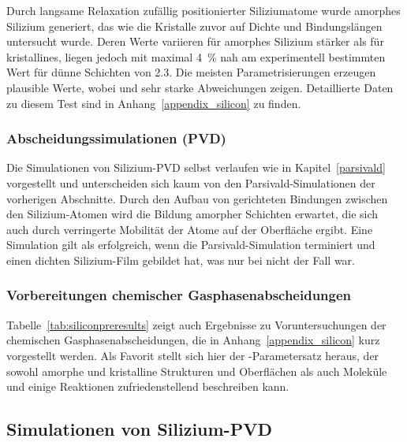 Durch langsame Relaxation zufällig positionierter Siliziumatome wurde amorphes Silizium generiert, das wie die Kristalle zuvor auf Dichte und Bindungslängen untersucht wurde.
Deren Werte variieren für amorphes Silizium stärker als für kristallines, liegen jedoch mit maximal \SI{4}{\percent} nah am experimentell bestimmten Wert für dünne Schichten von \SI{2.3}{\gpcc}\cite{remes_optical_1998}.
Die meisten Parametrisierungen erzeugen plausible Werte, wobei  und  sehr starke Abweichungen zeigen.
Detaillierte Daten zu diesem Test sind in Anhang~\ref{appendix_silicon} zu finden.

\subsubsection{Abscheidungssimulationen (PVD)}

Die Simulationen von Silizium-PVD selbst verlaufen wie in Kapitel~\ref{parsivald} vorgestellt und unterscheiden sich kaum von den Parsivald-Simulationen der vorherigen Abschnitte.
Durch den Aufbau von gerichteten Bindungen zwischen den Silizium-Atomen wird die Bildung amorpher Schichten erwartet, die sich auch durch verringerte Mobilität der Atome auf der Oberfläche ergibt.
Eine Simulation gilt als erfolgreich, wenn die Parsivald-Simulation terminiert und einen dichten Silizium-Film gebildet hat, was nur bei  nicht der Fall war.

\subsubsection{Vorbereitungen chemischer Gasphasenabscheidungen}

Tabelle~\ref{tab:siliconpreresults} zeigt auch Ergebnisse zu Voruntersuchungen der chemischen Gasphasenabscheidungen, die in Anhang~\ref{appendix_silicon} kurz vorgestellt werden.
Als Favorit stellt sich hier der -Parametersatz heraus, der sowohl amorphe und kristalline Strukturen und Oberflächen als auch Moleküle und einige Reaktionen zufriedenstellend beschreiben kann.

\subsection{Simulationen von Silizium-PVD}


